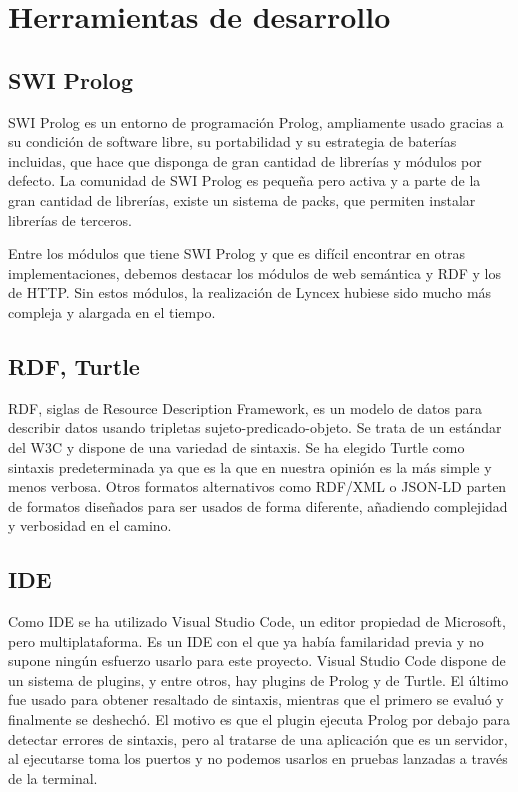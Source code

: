 \documentclass[12pt]{report} %
\begin{document}
\section{Herramientas de desarrollo}
\subsection{SWI Prolog}
SWI Prolog\cite{prolog} es un entorno de programación Prolog, ampliamente usado gracias a su condición de software libre, su portabilidad y 
su estrategia de baterías incluidas, que hace que disponga de gran cantidad de librerías y módulos por defecto.
La comunidad de SWI Prolog es pequeña pero activa y a parte de la gran cantidad de librerías, existe un sistema de packs, que permiten instalar librerías de terceros.

Entre los módulos que tiene SWI Prolog y que es difícil encontrar en otras implementaciones, debemos destacar los módulos de web semántica y RDF y los de HTTP.
Sin estos módulos, la realización de Lyncex hubiese sido mucho más compleja y alargada en el tiempo.

\subsection{RDF, Turtle}
RDF, siglas de Resource Description Framework, es un modelo de datos para describir datos usando tripletas sujeto-predicado-objeto. 
Se trata de un estándar del W3C y dispone de una variedad de sintaxis. Se ha elegido Turtle como sintaxis predeterminada ya que es la que en nuestra opinión es la más simple y menos verbosa.
Otros formatos alternativos como RDF/XML o JSON-LD parten de formatos diseñados para ser usados de forma diferente, añadiendo complejidad y verbosidad en el camino.

\subsection{IDE}
Como IDE se ha utilizado Visual Studio Code\cite{vscode}, un editor propiedad de Microsoft, pero multiplataforma.
Es un IDE con el que ya había familaridad previa y no supone ningún esfuerzo usarlo para este proyecto.
Visual Studio Code dispone de un sistema de plugins, y entre otros, hay plugins de Prolog y de Turtle.
El último fue usado para obtener resaltado de sintaxis, mientras que el primero se evaluó y finalmente se deshechó.
El motivo es que el plugin ejecuta Prolog por debajo para detectar errores de sintaxis, pero al tratarse de una aplicación que es un servidor, al ejecutarse toma los puertos y no podemos usarlos
en pruebas lanzadas a través de la terminal.
\end{document}
